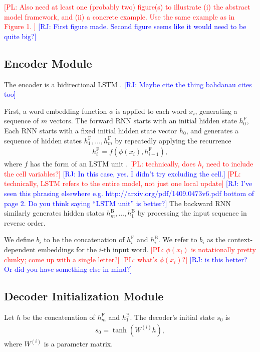 \documentclass[11pt,letterpaper]{article}
\newcommand{\phiin}{\phi}
\newcommand\pl[1]{\textcolor{red}{[PL: #1]}}
\newcommand\rj[1]{\textcolor{blue}{[RJ: #1]}}
\begin{document}
\pl{
  Also need at least one (probably two) figure(s)
  to illustrate (i) the abstract model framework,
  and (ii) a concrete example.  Use the same example as in Figure 1.
}
\rj{First figure made.  Second figure seems like it would need to be quite big?}


\subsection{Encoder Module}
The encoder is a bidirectional LSTM \cite{bahdanau2014neural}.
\rj{Maybe cite the thing bahdanau cites too}

First, a word embedding function $\phiin$ is applied
to each word $x_i$, generating a sequence of $m$ vectors.
The forward RNN starts with an initial hidden state $h_0^{\text{F}}$,
Each RNN starts with a fixed initial hidden state vector $h_0$, and 
generates a sequence of hidden states $h_1^{\text{F}}, \dotsc, h_m^{\text{F}}$ by
repeatedly applying the recurrence 
\begin{align}
  h_i^{\text{F}} = f(\phiin(x_i), h_{i-1}^{\text{F}}),
\end{align}
where $f$ has the form of an LSTM unit \cite{hochreiter1997lstm}.
\pl{technically, does $h_i$ need to include the cell variables?}
\rj{In this case, yes. I didn't try excluding the cell.}
\pl{technically, LSTM refers to the entire model, not just one local update}
\rj{I've seen this phrasing elsewhere
e.g. http://arxiv.org/pdf/1409.0473v6.pdf bottom of page 2.
Do you think saying ``LSTM unit'' is better?}
The backward RNN similarly generates hidden states $h_m^{\text{B}}, \dotsc, h_1^{\text{B}}$
by processing the input sequence in reverse order.

We define $b_i$ to be the concatenation of $h_i^{\text{F}}$ and $h_i^{\text{B}}$.
We refer to $b_i$ as the context-dependent embeddings
for the $i$-th input word.
\pl{$\phiin(x_i)$ is notationally pretty clunky; come up with a single letter?}
\pl{what's $\phi(x_i)$?}
\rj{is this better?  Or did you have something else in mind?}

\subsection{Decoder Initialization Module}
Let $h$ be the concatenation of $h_m^{\text{F}}$ and $h_1^{\text{B}}$.
The decoder's initial state $s_0$ is
\begin{align}
  s_0 = \tanh(W^{(i)} h),
\end{align}
where $W^{(i)}$ is a parameter matrix.
\end{document}
